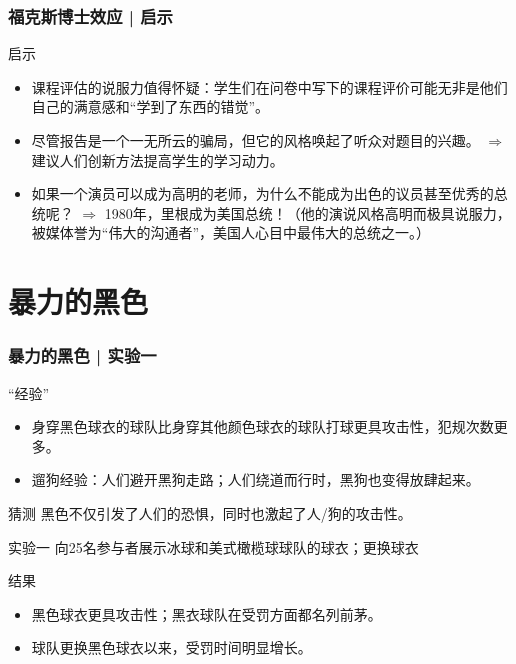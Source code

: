 \begin{frame}
  \frametitle{福克斯博士效应 | 启示}
  \begin{block}{启示}
    \begin{itemize}
      \item 课程评估的说服力值得怀疑：学生们在问卷中写下的课程评价可能无非是他们自己的满意感和“学到了东西的错觉”。
      \item 尽管报告是一个一无所云的骗局，但它的风格唤起了听众对题目的兴趣。 $\Longrightarrow$ 建议人们创新方法提高学生的学习动力。
      \item 如果一个演员可以成为高明的老师，为什么不能成为出色的议员甚至优秀的总统呢？ $\Longrightarrow$ 1980年，里根成为美国总统！（他的演说风格高明而极具说服力，被媒体誉为“伟大的沟通者”，美国人心目中最伟大的总统之一。）
    \end{itemize}
  \end{block}
\end{frame}

\section{暴力的黑色}
\begin{frame}
  \frametitle{暴力的黑色 | 实验一}
  \begin{block}{“经验”}
    \begin{itemize}
      \item 身穿黑色球衣的球队比身穿其他颜色球衣的球队打球更具攻击性，犯规次数更多。
      \item 遛狗经验：人们避开黑狗走路；人们绕道而行时，黑狗也变得放肆起来。
    \end{itemize}
  \end{block}
  \vspace{-0.5em}
  \pause
  \begin{block}{猜测}
    黑色不仅引发了人们的恐惧，同时也激起了人/狗的攻击性。
  \end{block}
  \vspace{-0.5em}
  \pause
  \begin{block}{实验一}
      向25名参与者展示冰球和美式橄榄球球队的球衣；更换球衣
  \end{block}
  \vspace{-0.5em}
  \pause
  \begin{block}{结果}
    \begin{itemize}
      \item 黑色球衣更具攻击性；黑衣球队在受罚方面都名列前茅。
      \item 球队更换黑色球衣以来，受罚时间明显增长。
    \end{itemize}
  \end{block}
\end{frame}

